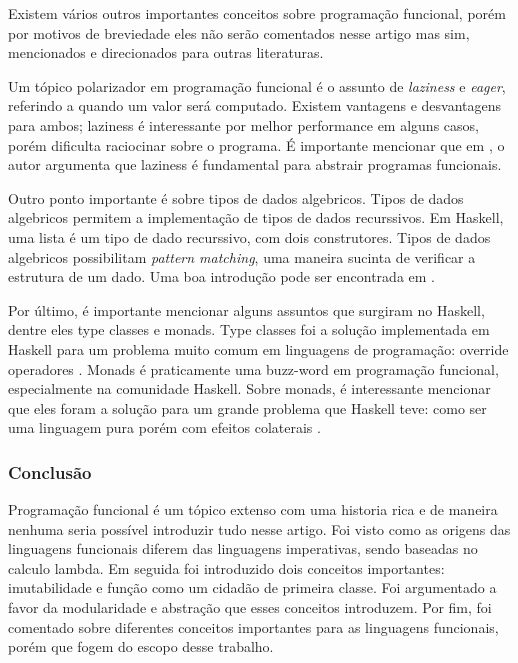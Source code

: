 Existem vários outros importantes conceitos sobre programação funcional, porém por motivos de breviedade eles não serão comentados nesse artigo mas sim, mencionados e direcionados para outras literaturas.

Um tópico polarizador em programação funcional é o assunto de \emph{laziness} e \emph{eager}, referindo a quando um valor será computado.
Existem vantagens e desvantagens para ambos; laziness é interessante por melhor performance em alguns casos, porém dificulta raciocinar sobre o programa.
É importante mencionar que em \cite{whyfpm}, o autor argumenta que laziness é fundamental para abstrair programas funcionais.

Outro ponto importante é sobre tipos de dados algebricos.
Tipos de dados algebricos permitem a implementação de tipos de dados recurssivos.
Em Haskell, uma lista é um tipo de dado recurssivo, com dois construtores.
Tipos de dados algebricos possibilitam \emph{pattern matching}, uma maneira sucinta de verificar a estrutura de um dado.
Uma boa introdução pode ser encontrada em \cite{lipovaca}.

Por último, é importante mencionar alguns assuntos que surgiram no Haskell, dentre eles type classes e monads.
Type classes foi a solução implementada em Haskell para um problema muito comum em linguagens de programação: override operadores \cite{haskell-ivory}.
Monads é praticamente uma buzz-word em programação funcional, especialmente na comunidade Haskell.
Sobre monads, é interessante mencionar que eles foram a solução para um grande problema que Haskell teve: como ser uma linguagem pura porém com efeitos colaterais \cite{haskell-ivory}.

\subsubsection{Conclusão}

Programação funcional é um tópico extenso com uma historia rica e de maneira nenhuma seria possível introduzir tudo nesse artigo.
Foi visto como as origens das linguagens funcionais diferem das linguagens imperativas, sendo baseadas no calculo lambda.
Em seguida foi introduzido dois conceitos importantes: imutabilidade e função como um cidadão de primeira classe.
Foi argumentado a favor da modularidade e abstração que esses conceitos introduzem.
Por fim, foi comentado sobre diferentes conceitos importantes para as linguagens funcionais, porém que fogem do escopo desse trabalho.


